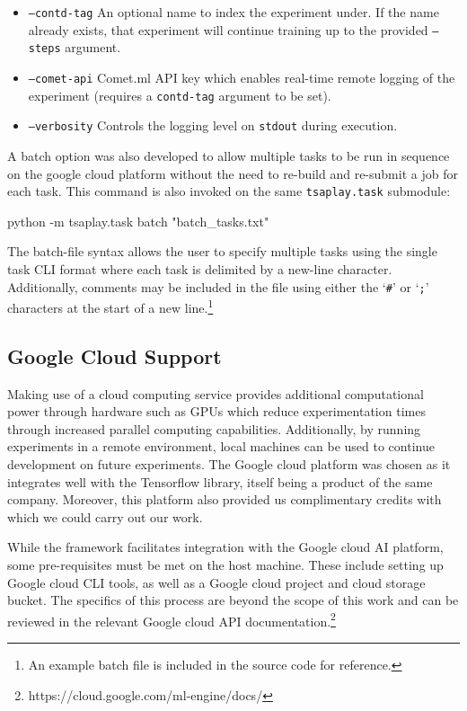 \documentclass[../../fyp.tex]{subfiles}
\begin{document}
\begin{itemize}
\item \texttt{--contd-tag} An optional name to index the experiment under. If the name already exists, that experiment will continue training up to the provided \texttt{--steps} argument.
\item \texttt{--comet-api} Comet.ml API key which enables real-time remote logging of the experiment (requires a \texttt{contd-tag} argument to be set). 
\item \texttt{--verbosity} Controls the logging level on \texttt{stdout} during execution.  
\end{itemize}
\clearpage
A batch option was also developed to allow multiple tasks to be run in sequence on the google cloud platform without the need to re-build and re-submit a job for each task. This command is also invoked on the same \texttt{tsaplay.task} submodule: 
\begin{code}
	python -m tsaplay.task batch "batch_tasks.txt"
\end{code}

The batch-file syntax allows the user to specify multiple tasks using the single task CLI format where each task is delimited by a new-line character. Additionally, comments may be included in the file using either the \enquote*{\texttt{\#}} or \enquote*{\texttt{;}} characters at the start of a new line.\footnote{An example batch file is included in the source code for reference.}

\subsection{Google Cloud Support}
Making use of a cloud computing service provides additional computational power through hardware such as GPUs which reduce experimentation times through increased parallel computing capabilities. Additionally, by running experiments in a remote environment, local machines can be used to continue development on future experiments. The Google cloud platform was chosen as it integrates well with the Tensorflow library, itself being a product of the same company. Moreover, this platform also provided us complimentary credits with which we could carry out our work. 

While the framework facilitates integration with the Google cloud AI platform, some pre-requisites must be met on the host machine. These include setting up Google cloud CLI tools, as well as a Google cloud project and cloud storage bucket. The specifics of this process are beyond the scope of this work and can be reviewed in the relevant Google cloud API documentation.\footnote{https://cloud.google.com/ml-engine/docs/}
\end{document}
